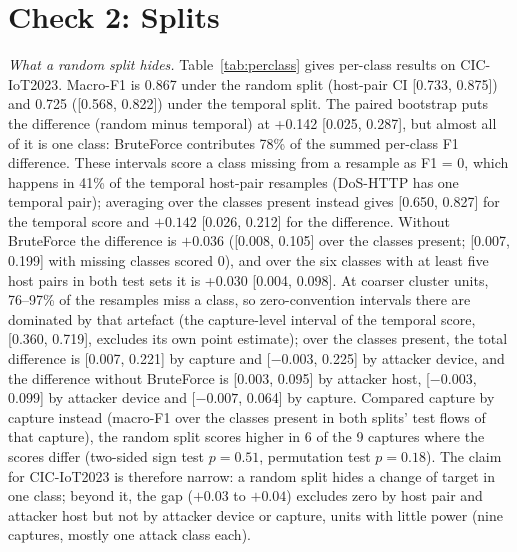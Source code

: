\section{Check 2: Splits}\label{sec:splits}

\emph{What a random split hides.} Table~\ref{tab:perclass} gives per-class results on CIC-IoT2023. Macro-F1 is 0.867 under the random split (host-pair CI [0.733, 0.875]) and 0.725 ([0.568, 0.822]) under the temporal split. The paired bootstrap puts the difference (random minus temporal) at +0.142 [0.025, 0.287], but almost all of it is one class: BruteForce contributes 78\% of the summed per-class F1 difference. These intervals score a class missing from a resample as F1 = 0, which happens in 41\% of the temporal host-pair resamples (DoS-HTTP has one temporal pair); averaging over the classes present instead gives [0.650, 0.827] for the temporal score and $+0.142$ [0.026, 0.212] for the difference. Without BruteForce the difference is $+0.036$ ([0.008, 0.105] over the classes present; [0.007, 0.199] with missing classes scored 0), and over the six classes with at least five host pairs in both test sets it is +0.030 [0.004, 0.098]. At coarser cluster units, 76--97\% of the resamples miss a class, so zero-convention intervals there are dominated by that artefact (the capture-level interval of the temporal score, [0.360, 0.719], excludes its own point estimate); over the classes present, the total difference is [0.007, 0.221] by capture and [$-0.003$, 0.225] by attacker device, and the difference without BruteForce is [0.003, 0.095] by attacker host, [$-0.003$, 0.099] by attacker device and [$-0.007$, 0.064] by capture. Compared capture by capture instead (macro-F1 over the classes present in both splits' test flows of that capture), the random split scores higher in 6 of the 9 captures where the scores differ (two-sided sign test $p=0.51$, permutation test $p=0.18$). The claim for CIC-IoT2023 is therefore narrow: a random split hides a change of target in one class; beyond it, the gap ($+0.03$ to $+0.04$) excludes zero by host pair and attacker host but not by attacker device or capture, units with little power (nine captures, mostly one attack class each).

